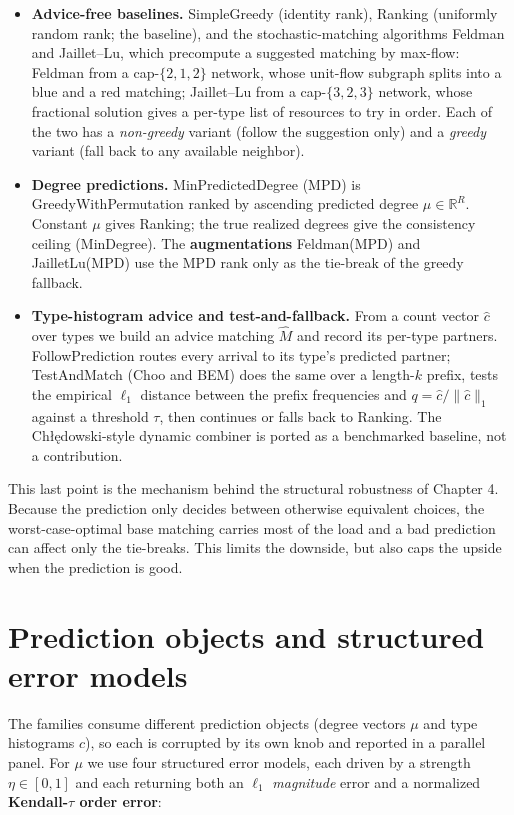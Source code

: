 \begin{itemize}
\item
  \textbf{Advice-free baselines.} SimpleGreedy (identity rank), Ranking
  (uniformly random rank; the baseline), and the stochastic-matching
  algorithms Feldman and Jaillet--Lu, which precompute a suggested
  matching by max-flow: Feldman from a cap-\(\{2,1,2\}\) network, whose
  unit-flow subgraph splits into a blue and a red matching; Jaillet--Lu
  from a cap-\(\{3,2,3\}\) network, whose fractional solution gives a
  per-type list of resources to try in order. Each of the two has a
  \emph{non-greedy} variant (follow the suggestion only) and a
  \emph{greedy} variant (fall back to any available neighbor).
\item
  \textbf{Degree predictions.} MinPredictedDegree (MPD) is
  GreedyWithPermutation ranked by ascending predicted degree
  \(\mu\in\mathbb R^R\). Constant \(\mu\) gives Ranking; the true
  realized degrees give the consistency ceiling (MinDegree). The
  \textbf{augmentations} Feldman(MPD) and JailletLu(MPD) use the MPD
  rank only as the tie-break of the greedy fallback.
\item
  \textbf{Type-histogram advice and test-and-fallback.} From a count
  vector \(\hat c\) over types we build an advice matching \(\hat M\)
  and record its per-type partners. FollowPrediction routes every
  arrival to its type's predicted partner; TestAndMatch (Choo and BEM)
  does the same over a length-\(k\) prefix, tests the empirical
  \(\ell_1\) distance between the prefix frequencies and
  \(q=\hat c/\lVert\hat c\rVert_1\) against a threshold \(\tau\), then
  continues or falls back to Ranking. The Chłędowski-style dynamic
  combiner is ported as a benchmarked baseline, not a contribution.
\end{itemize}

This last point is the mechanism behind the structural robustness of
Chapter 4. Because the prediction only decides between otherwise
equivalent choices, the worst-case-optimal base matching carries most of
the load and a bad prediction can affect only the tie-breaks. This
limits the downside, but also caps the upside when the prediction is
good.

\section{Prediction objects and structured error
models}

The families consume different prediction objects (degree vectors
\(\mu\) and type histograms \(\hat c\)), so each is corrupted by its own
knob and reported in a parallel panel. For \(\mu\) we use four
structured error models, each driven by a strength \(\eta\in[0,1]\) and
each returning both an \(\ell_1\) \emph{magnitude} error and a
normalized \textbf{Kendall-\(\tau\) order error}:


